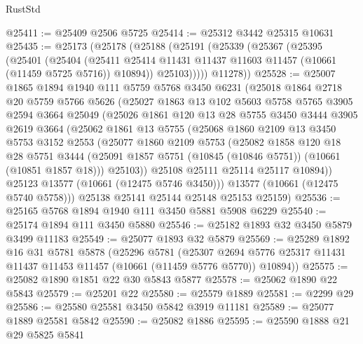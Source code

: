 \begin{lexlean}{RustStd}
\begin{coremodule}
@25411 := @25409 @2506 @5725
@25414 := @25312 @3442 @25315 @10631
@25435 := @25173
    (@25178
      (@25188
        (@25191
          (@25339
            (@25367
              (@25395
                (@25401
                  (@25404
                    (@25411
                      @25414
                      @11431
                      @11437
                      @11603
                      @11457
                      (@10661 (@11459 @5725 @5716))
                      @10894))
                  @25103)))))
        @11278))
@25528 := @25007
    @1865
    @1894
    @1940
    @111
    @5759
    @5768
    @3450
    @6231
    (@25018
      @1864
      @2718
      @20
      @5759
      @5766
      @5626
      (@25027
        @1863
        @13
        @102
        @5603
        @5758
        @5765
        @3905
        @2594
        @3664
        @25049
        (@25026
          @1861
          @120
          @13
          @28
          @5755
          @3450
          @3444
          @3905
          @2619
          @3664
          (@25062
            @1861
            @13
            @5755
            (@25068
              @1860
              @2109
              @13
              @3450
              @5753
              @3152
              @2553
              (@25077
                @1860
                @2109
                @5753
                (@25082
                  @1858
                  @120
                  @18
                  @28
                  @5751
                  @3444
                  (@25091 @1857 @5751 (@10845 (@10846 @5751)) (@10661 (@10851 @1857 @18)))
                  @25103))
              @25108
              @25111
              @25114
              @25117
              @10894))
          @25123
          @13577
          (@10661 (@12475 @5746 @3450)))
        @13577
        (@10661 (@12475 @5740 @5758)))
      @25138
      @25141
      @25144
      @25148
      @25153
      @25159)
@25536 := @25165 @5768 @1894 @1940 @111 @3450 @5881 @5908 @6229
@25540 := @25174 @1894 @111 @3450 @5880
@25546 := @25182 @1893 @32 @3450 @5879 @3499 @11183
@25549 := @25077 @1893 @32 @5879
@25569 := @25289
    @1892
    @16
    @31
    @5781
    @5878
    (@25296
      @5781
      (@25307 @2694 @5776 @25317 @11431 @11437 @11453 @11457 (@10661 (@11459 @5776 @5770)) @10894))
@25575 := @25082 @1890 @1851 @22 @30 @5843 @5877
@25578 := @25062 @1890 @22 @5843
@25579 := @25201 @22
@25580 := @25579 @1889
@25581 := @2299 @29
@25586 := @25580 @25581 @3450 @5842 @3919 @11181
@25589 := @25077 @1889 @25581 @5842
@25590 := @25082 @1886
@25595 := @25590 @1888 @21 @29 @5825 @5841

\end{coremodule}
\end{lexlean}
